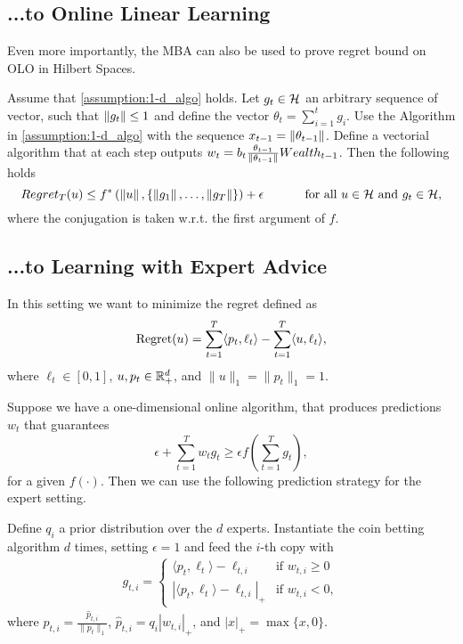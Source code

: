 \subsection{...to Online Linear Learning}

Even more importantly, the \ac{MBA} can also be used to prove regret bound on \ac{OLO} in Hilbert Spaces.

\begin{theorem}
\label{theo:hilbert_reward}
  Assume that \ref{assumption:1-d_algo} holds.
  Let $g_t \in \mathcal{H}$ an arbitrary sequence of vector, such that $\left\|{g_t}\right\| \leq 1$ and define the vector $\theta_t=\sum_{i=1}^{t} g_i$.
  Use the Algorithm in \ref{assumption:1-d_algo} with the sequence $x_{t-1}= \left\|{\theta_{t-1}}\right\|$.
  Define a vectorial algorithm that at each step outputs $w_t = b_t \frac{\theta_{t-1}}{\left\|{\theta_{t-1}}\right\|} Wealth_{t-1}$. Then the following holds
  \[
    Regret_T(u) \leq f^*\left( \left\|{u}\right\|, \left\{\left\|{g_1}\right\|, \ldots, \left\|{g_T}\right\|\right\}\right)+\epsilon \quad \quad \quad \textnormal{ for all } u \in \mathcal{H} \textnormal{ and } g_t \in \mathcal{H},
  \]
  where the conjugation is taken w.r.t. the first argument of $f$.
\end{theorem}

\subsection{...to Learning with Expert Advice}

In this setting we want to minimize the regret defined as
\[
\operatorname{Regret}(u) = \sum_{t=1}^T \langle p_t, \ell_t \rangle - \sum_{t=1}^T \langle u, \ell_t \rangle,
\]
where $\ell_t \in [0,1]$, $u, p_t \in \mathbb{R}^d_+$, and $\|u\|_1 = \|p_t\|_1 = 1$.

Suppose we have a one-dimensional online algorithm, that produces
predictions $w_t$ that guarantees
\[
\epsilon + \sum_{t=1}^T w_t g_t \ge \epsilon f\left(\sum_{t=1}^T g_t\right),
\]
for a given $f(\cdot)$. Then we can use the following prediction strategy for the expert setting.

Define $q_i$ a prior distribution over the $d$ experts. Instantiate the coin
betting algorithm $d$ times, setting $\epsilon =1$ and feed the $i$-th copy with
\begin{align}
g_{t,i} = \begin{cases}
\langle p_t, \ell_t\rangle - \ell_{t,i} & \text{if } w_{t,i} \ge 0 \\
|\langle p_t, \ell_t\rangle - \ell_{t,i}|_+ & \text{if } w_{t,i} < 0,
\end{cases}
\end{align}
where $p_{t,i} = \frac{\hat{p}_{t,i}}{\|p_{t}\|_1}$, $\hat{p}_{t,i}=q_i |w_{t,i}|_+$, and $|x|_+=\max\{x,0\}$.

